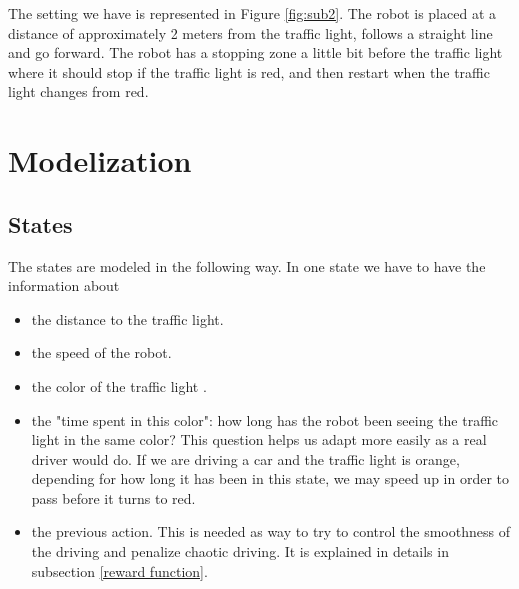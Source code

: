 \documentclass[14pt,a4paper]{article}
\theoremstyle{definition}
\begin{document}
The setting we have is represented in Figure \ref{fig:sub2}. The robot is placed at a distance of approximately 2 meters from the traffic light, follows a straight line and go forward.
The robot has a stopping zone a little bit before the traffic light where it should stop if the traffic light is red, and then restart when the traffic light changes from red.



\section{Modelization}

\subsection{States}
The states are modeled in the following way. In one state we have to have the information about
\begin{itemize}
\item   the distance to the traffic light.
\item the speed of the robot.
\item the color of the traffic light .
\item the "time spent in this color": how long has the robot been seeing the traffic light in the same color? This question helps us adapt more easily as a real driver would do. If we are driving a car and the traffic light is orange, depending for how long it has been in this state, we may speed up in order to pass before it turns to red.
\item the previous action. This is needed as way to try to control the smoothness of the driving and penalize chaotic driving. It is explained in details in subsection \ref{reward function}.

 \end{itemize}
\end{document}
